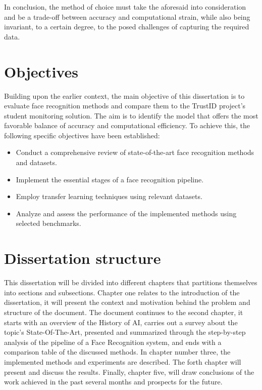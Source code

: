 \documentclass[class=report, crop=false, a4paper, 12pt]{standalone}
\begin{document}
\par In conclusion, the method of choice must take the aforesaid into consideration and be a trade-off between accuracy and computational strain, while also being invariant, to a certain degree, to the posed challenges of capturing the required data. 

\section{Objectives}
Building upon the earlier context, the main objective of this dissertation is to evaluate face recognition methods and compare them to the TrustID project's student monitoring solution. The aim is to identify the model that offers the most favorable balance of accuracy and computational efficiency. To achieve this, the following specific objectives have been established:
\begin{itemize}
    \item Conduct a comprehensive review of state-of-the-art face recognition methods and datasets.
    \item Implement the essential stages of a face recognition pipeline.
    \item Employ transfer learning techniques using relevant datasets.
    \item Analyze and assess the performance of the implemented methods using selected benchmarks.
\end{itemize}

\section{Dissertation structure}
\par This dissertation will be divided into different chapters that partitions themselves into sections and subsections. Chapter one relates to the introduction of the dissertation, it will present the context and motivation behind the problem and structure of the document. The document continues to the second chapter, it starts with an overview of the History of AI, carries out a survey about the topic's State-Of-The-Art, presented and summarized through the step-by-step analysis of the pipeline of a Face Recognition system, and ends with a comparison table of the discussed methods. In chapter number three, the implemented methods and experiments are described. The forth chapter will present and discuss the results. Finally, chapter five, will draw conclusions of the work achieved in the past several months and prospects for the future.
\end{document}
